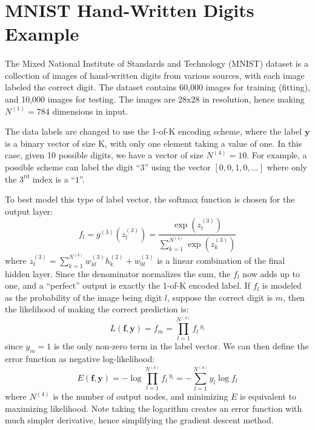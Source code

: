 \section{MNIST Hand-Written Digits Example} \label{sc:MNIST}

\paragraph{}
The Mixed National Institute of Standards and Technology
(MNIST) dataset \cite{Le98} is a collection of images of hand-written digits
from various sources,
with each image labeled the correct digit.
The dataset contains 60,000 images for training (fitting),
and 10,000 images for testing.
The images are 28x28 in resolution,
hence making $N^{(1)} = 784$ dimensions in input.

The data labels are changed to use the 1-of-K encoding scheme,
where the label $\mathbf{y}$ is a binary vector of size K,
with only one element taking a value of one.
In this case, given 10 possible digits,
we have a vector of size $N^{(4)} = 10$.
For example, a possible scheme can label the digit ``$3$'' 
using the vector $[0,0,1,0,\ldots]$ where 
only the $3^\text{rd}$ index is a ``$1$''.

To best model this type of label vector,
the softmax function is chosen for the output layer:
%
\begin{equation*}
	f_l = 
	g^{(3)}(z_l^{(3)}) = \frac{\exp(z_l^{(3)})}
		{\sum_{k=1}^{N^{(4)}} \exp(z_k^{(3)})}
\end{equation*}
%
where $z^{(3)}_l = \sum_{k=1}^{N^{(3)}} w_{kl}^{(3)} h_k^{(2)} + 
      w^{(3)}_{0l}$ 
      is a linear combination of the final hidden layer.
Since the denominator normalizes the sum, the $f_l$ now adds up to one,
and a ``perfect'' output is exactly the 1-of-K encoded label.
If $f_l$ is modeled as the probability of the image being digit $l$,
suppose the correct digit is $m$,
then the likelihood of making the correct prediction is:
%
\begin{equation*}
  L(\mathbf{f},\mathbf{y}) = f_m = \prod_{l=1}^{N^{(4)}} f_l \, ^{y_l}
\end{equation*}
%
since $y_m = 1$ is the only non-zero term in the label vector.
We can then define the error function as negative log-likelihood:
%
\begin{equation*}
	E(\mathbf{f},\mathbf{y}) 
		= - \log \prod_{l=1}^{N^{(4)}} f_l \, ^{y_l}
		= - \sum_{l=1}^{N^{(4)}} y_l \log f_l
\end{equation*}
%
where $N^{(4)}$ is the number of output nodes, 
and minimizing $E$ is equivalent to maximizing likelihood.
Note taking the logarithm creates an error function with much
simpler derivative, 
hence simplifying the gradient descent method.

